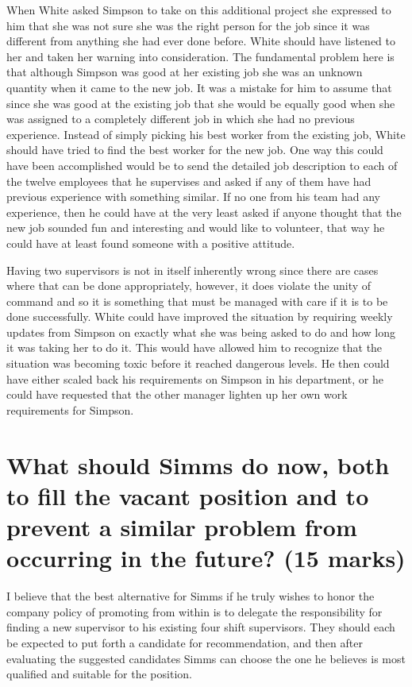 \documentclass[12pt,titlepage]{article}
\begin{document}
When White asked Simpson to take on this additional project she expressed to him that she was not sure she was the right person for the job since it was different from anything she had ever done before. White should have listened to her and taken her warning into consideration. The fundamental problem here is that although Simpson was good at her existing job she was an unknown quantity when it came to the new job. It was a mistake for him to assume that since she was good at the existing job that she would be equally good when she was assigned to a completely different job in which she had no previous experience. Instead of simply picking his best worker from the existing job, White should have tried to find the best worker for the new job. One way this could have been accomplished would be to send the detailed job description to each of the twelve employees that he supervises and asked if any of them have had previous experience with something similar. If no one from his team had any experience, then he could have at the very least asked if anyone thought that the new job sounded fun and interesting and would like to volunteer, that way he could have at least found someone with a positive attitude. 

Having two supervisors is not in itself inherently wrong since there are cases where that can be done appropriately, however, it does violate the unity of command and so it is something that must be managed with care if it is to be done successfully. White could have improved the situation by requiring weekly updates from Simpson on exactly what she was being asked to do and how long it was taking her to do it. This would have allowed him to recognize that the situation was becoming toxic before it reached dangerous levels. He then could have either scaled back his requirements on Simpson in his department, or he could have requested that the other manager lighten up her own work requirements for Simpson. 

\section{What should Simms do now, both to fill the vacant position and to prevent a similar problem from occurring in the future? (15 marks)}

I believe that the best alternative for Simms if he truly wishes to honor the company policy of promoting from within is to delegate the responsibility for finding a new supervisor to his existing four shift supervisors. They should each be expected to put forth a candidate for recommendation, and then after evaluating the suggested candidates Simms can choose the one he believes is most qualified and suitable for the position. 
\end{document}
